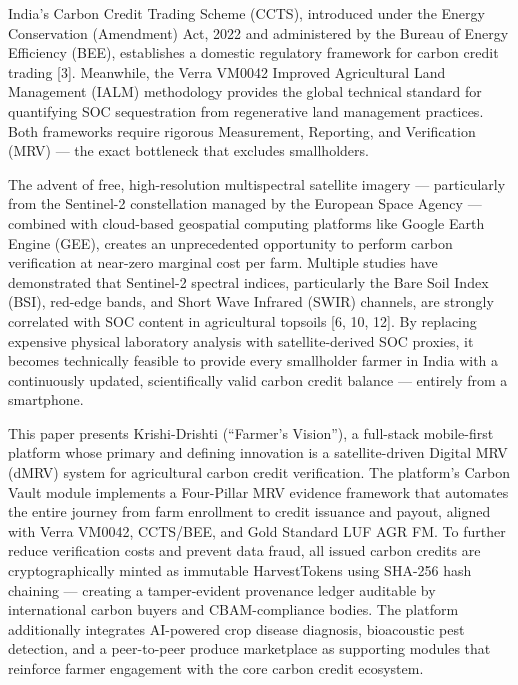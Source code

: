\documentclass[10pt,a4paper]{article}
\begin{document}
India's Carbon Credit Trading Scheme (CCTS), introduced under the Energy Conservation (Amendment) Act, 2022 and administered by the Bureau of Energy Efficiency (BEE), establishes a domestic regulatory framework for carbon credit trading [3]. Meanwhile, the Verra VM0042 Improved Agricultural Land Management (IALM) methodology provides the global technical standard for quantifying SOC sequestration from regenerative land management practices. Both frameworks require rigorous Measurement, Reporting, and Verification (MRV) — the exact bottleneck that excludes smallholders.

The advent of free, high-resolution multispectral satellite imagery — particularly from the Sentinel-2 constellation managed by the European Space Agency — combined with cloud-based geospatial computing platforms like Google Earth Engine (GEE), creates an unprecedented opportunity to perform carbon verification at near-zero marginal cost per farm. Multiple studies have demonstrated that Sentinel-2 spectral indices, particularly the Bare Soil Index (BSI), red-edge bands, and Short Wave Infrared (SWIR) channels, are strongly correlated with SOC content in agricultural topsoils [6, 10, 12]. By replacing expensive physical laboratory analysis with satellite-derived SOC proxies, it becomes technically feasible to provide every smallholder farmer in India with a continuously updated, scientifically valid carbon credit balance — entirely from a smartphone.

This paper presents Krishi-Drishti (``Farmer's Vision''), a full-stack mobile-first platform whose primary and defining innovation is a satellite-driven Digital MRV (dMRV) system for agricultural carbon credit verification. The platform's Carbon Vault module implements a Four-Pillar MRV evidence framework that automates the entire journey from farm enrollment to credit issuance and payout, aligned with Verra VM0042, CCTS/BEE, and Gold Standard LUF AGR FM. To further reduce verification costs and prevent data fraud, all issued carbon credits are cryptographically minted as immutable HarvestTokens using SHA-256 hash chaining — creating a tamper-evident provenance ledger auditable by international carbon buyers and CBAM-compliance bodies. The platform additionally integrates AI-powered crop disease diagnosis, bioacoustic pest detection, and a peer-to-peer produce marketplace as supporting modules that reinforce farmer engagement with the core carbon credit ecosystem.
\end{document}
